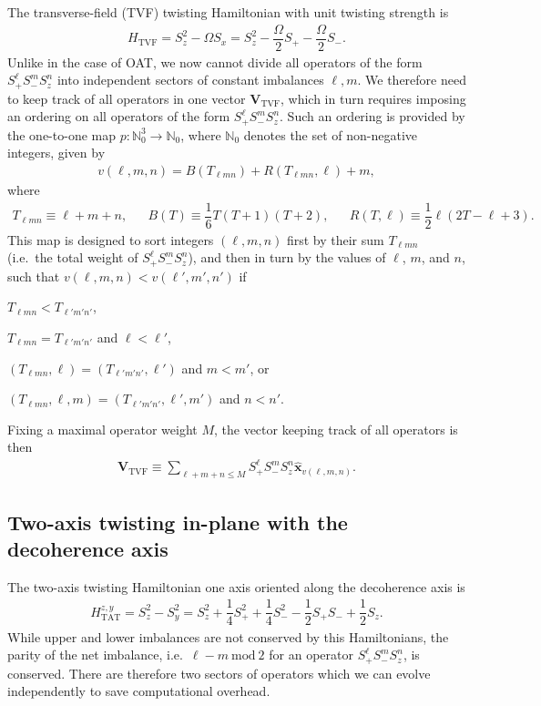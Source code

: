 \documentclass[aps,notitlepage,nofootinbib,11pt]{revtex4-1}
\renewcommand{\t}{\text} %
\newcommand{\f}[2]{\dfrac{#1}{#2}} %
\newcommand{\p}[1]{\left(#1\right)} %
\renewcommand{\v}{\bm} %
\newcommand{\uv}[1]{\v{\hat{#1}}} %
\newcommand{\1}{\mathds{1}}
\begin{document}
The transverse-field (TVF) twisting Hamiltonian with unit twisting
strength is
\begin{align}
  H_{\t{TVF}}
  = S_z^2 - \Omega S_x
  = S_z^2 - \f{\Omega}{2} S_+ - \f{\Omega}{2} S_-.
\end{align}
Unlike in the case of OAT, we now cannot divide all operators of the
form $S_+^\ell S_-^m S_z^n$ into independent sectors of constant
imbalances $\ell,m$.  We therefore need to keep track of all operators
in one vector $\v V_{\t{TVF}}$, which in turn requires imposing an
ordering on all operators of the form $S_+^\ell S_-^m S_z^n$.  Such an
ordering is provided by the one-to-one map
$p:\mathbb{N}_0^3\to\mathbb{N}_0$, where $\mathbb{N}_0$ denotes the
set of non-negative integers, given by
\begin{align}
  v\p{\ell,m,n} = B\p{T_{\ell mn}} + R\p{T_{\ell mn},\ell} + m,
  \label{eq:vec_map}
\end{align}
where
\begin{align}
  T_{\ell mn} \equiv \ell + m + n,
  &&
  B\p{T} \equiv \f16 T \p{T+1} \p{T+2},
  &&
  R\p{T,\ell} \equiv \f12 \ell \p{2 T - \ell + 3}.
\end{align}
This map is designed to sort integers $\p{\ell,m,n}$ first by their
sum $T_{\ell mn}$ (i.e.~the total weight of $S_+^\ell S_-^m S_z^n$),
and then in turn by the values of $\ell$, $m$, and $n$, such that
$v\p{\ell,m,n}<v\p{\ell',m',n'}$ if
\begin{enumerate*}[label=(\roman*)]
\item $T_{\ell mn}<T_{\ell'm'n'}$,
\item $T_{\ell mn}=T_{\ell'm'n'}$ and $\ell<\ell'$,
\item $\p{T_{\ell mn},\ell}=\p{T_{\ell'm'n'},\ell'}$ and $m<m'$, or
\item $\p{T_{\ell mn},\ell,m}=\p{T_{\ell'm'n'},\ell',m'}$ and $n<n'$.
\end{enumerate*}
Fixing a maximal operator weight $M$, the vector keeping track of all
operators is then
\begin{align}
  \v V_{\t{TVF}}
  \equiv \sum_{\ell+m+n\le M} S_+^\ell S_-^m S_z^n \uv x_{v\p{\ell,m,n}}.
\end{align}


\subsection{Two-axis twisting in-plane with the decoherence axis}

The two-axis twisting Hamiltonian one axis oriented along the
decoherence axis is
\begin{align}
  H_{\t{TAT}}^{z,y}
  = S_z^2 - S_y^2
  = S_z^2 + \f14 S_+^2 + \f14 S_-^2 - \f12 S_+ S_- + \f12 S_z.
\end{align}
While upper and lower imbalances are not conserved by this
Hamiltonians, the parity of the net imbalance, i.e.~$\ell-m~\t{mod}~2$
for an operator $S_+^\ell S_-^m S_z^n$, is conserved.  There are
therefore two sectors of operators which we can evolve independently
to save computational overhead.
\end{document}
